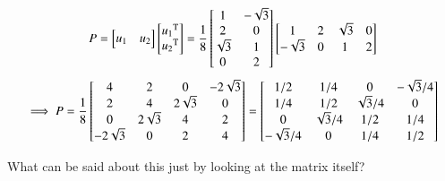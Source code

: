 \documentclass{article}      %
\newcommand{\transpose}[1]{{{#1}^{\text{T}}}}
\begin{document}
\[
P =
\begin{bmatrix}
u_1 & u_2 \\
\end{bmatrix}
\begin{bmatrix}
\transpose{u_1} \\
\transpose{u_2} \\
\end{bmatrix}
=
\inv{8}
\begin{bmatrix}
1 & -\sqrt{3} \\
2 & 0 \\
\sqrt{3} & 1 \\
0 & 2 \\
\end{bmatrix}
\begin{bmatrix}
1 & 2 & \sqrt{3} & 0 \\
-\sqrt{3} & 0 & 1 & 2 \\
\end{bmatrix}
\]
\[
\implies
P =
\frac{1}{8}
\begin{bmatrix}
4 & 2 & 0 & -2\sqrt{3} \\
2 & 4 & 2\sqrt{3} & 0 \\
0 & 2\sqrt{3} & 4 & 2 \\
-2\sqrt{3} & 0 & 2 & 4 \\
\end{bmatrix}
=
\begin{bmatrix}
1/2 & 1/4 & 0 & -\sqrt{3}/4 \\
1/4 & 1/2 & \sqrt{3}/4 & 0 \\
0 & \sqrt{3}/4 & 1/2 & 1/4 \\
-\sqrt{3}/4 & 0 & 1/4 & 1/2 \\
\end{bmatrix}
\]

What can be said about this just by looking at the matrix itself?
\end{document}
